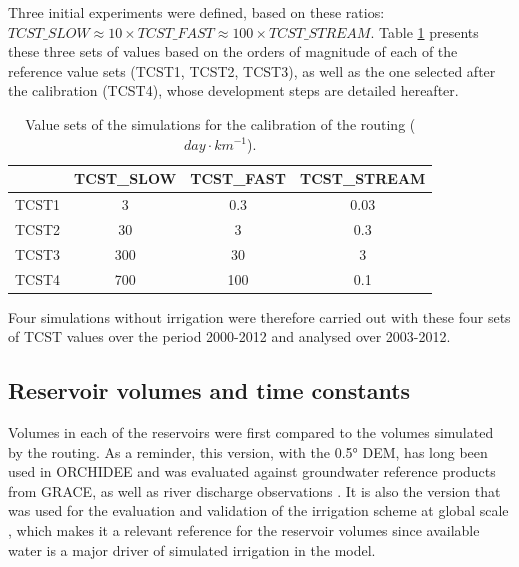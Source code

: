 Three initial experiments were defined, based on these ratios:\\$TCST\_SLOW \approx 10 \times TCST\_FAST \approx 100 \times TCST\_STREAM$.
Table \ref{table:tcst_exp} presents these three sets of values based on the orders of magnitude of each of the reference value sets (TCST1, TCST2, TCST3), as well as the one selected after the calibration (TCST4), whose development steps are detailed hereafter.

\begin{table}[h]
\centering
\begin{tabular}{|l|c|c|c|}
\hline
\textbf{} & \textbf{TCST\_SLOW} & \textbf{TCST\_FAST} & \textbf{TCST\_STREAM} \\ \hline
TCST1 & 3 & 0.3 & 0.03 \\ \hline
TCST2 & 30 & 3 & 0.3 \\ \hline
TCST3 & 300 & 30 & 3 \\ \hline
TCST4 & 700 & 100 & 0.1 \\ \hline
\end{tabular}
\caption{Value sets of the simulations for the calibration of the \native routing ($day \cdot km^{-1}$).}
\label{table:tcst_exp}
\end{table}

Four simulations without irrigation were therefore carried out with these four sets of TCST values over the period 2000-2012 and analysed over 2003-2012.

\subsection{Reservoir volumes and time constants}

Volumes in each of the reservoirs were first compared to the volumes simulated by the \std routing. As a reminder, this version, with the 0.5° DEM, has long been used in ORCHIDEE and was evaluated against groundwater reference products from GRACE, as well as river discharge observations  \citep{ngo-duc_53-year_2005, ngo-duc_validation_2007}.
It is also the version that was used for the evaluation and validation of the irrigation scheme at global scale \citep{arboleda-obando_validation_2024}, which makes it a relevant reference for the reservoir volumes since available water is a major driver of simulated irrigation in the model. 

